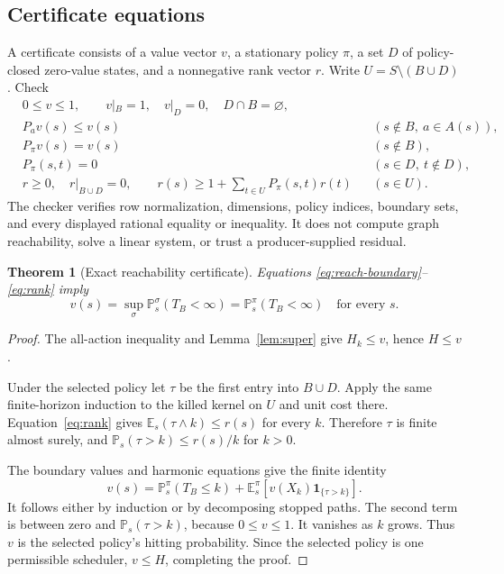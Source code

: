 \documentclass[11pt,letterpaper]{article}
\newtheorem{theorem}{Theorem}[section]
\theoremstyle{definition}\newtheorem{definition}[theorem]{Definition}
\theoremstyle{remark}\newtheorem{remark}[theorem]{Remark}
\newcommand{\E}{\mathbb E}\newcommand{\Prob}{\mathbb P}
\newcommand{\ind}{\mathbf 1}\newcommand{\forge}{\texttt{forge}}
\begin{document}
\subsection{Certificate equations}
A certificate consists of a value vector $v$, a stationary policy $\pi$, a set $D$ of policy-closed zero-value states, and a nonnegative rank vector $r$. Write $U=S\setminus(B\cup D)$. Check
\begin{align}
 &0\le v\le1,\qquad v|_B=1,\quad v|_D=0,\quad D\cap B=\varnothing,\label{eq:reach-boundary}\\
 &P_av(s)\le v(s) &&(s\notin B,\ a\in A(s)),\label{eq:reach-upper}\\
 &P_\pi v(s)=v(s) &&(s\notin B),\label{eq:reach-harmonic}\\
 &P_\pi(s,t)=0 &&(s\in D,\ t\notin D),\label{eq:dead-closed}\\
 &r\ge0,\quad r|_{B\cup D}=0,\qquad
 r(s)\ge1+\sum_{t\in U}P_\pi(s,t)r(t) &&(s\in U).\label{eq:rank}
\end{align}
The checker verifies row normalization, dimensions, policy indices, boundary sets, and every displayed rational equality or inequality. It does not compute graph reachability, solve a linear system, or trust a producer-supplied residual.

\begin{theorem}[Exact reachability certificate]\label{thm:reach}
Equations \eqref{eq:reach-boundary}--\eqref{eq:rank} imply
\[
 v(s)=\sup_\sigma\Prob_s^\sigma(T_B<\infty)
     =\Prob_s^\pi(T_B<\infty)
 \quad\text{for every }s.
\]
\end{theorem}
\begin{proof}
The all-action inequality and Lemma~\ref{lem:super} give $H_k\le v$, hence $H\le v$.

Under the selected policy let $\tau$ be the first entry into $B\cup D$. Apply the same finite-horizon induction to the killed kernel on $U$ and unit cost there. Equation~\eqref{eq:rank} gives $\E_s(\tau\wedge k)\le r(s)$ for every $k$. Therefore $\tau$ is finite almost surely, and $\Prob_s(\tau>k)\le r(s)/k$ for $k>0$.

The boundary values and harmonic equations give the finite identity
\[
 v(s)=\Prob_s^\pi(T_B\le k)
       +\E_s^\pi\!\left[v(X_k)\ind_{\{\tau>k\}}\right].
\]
It follows either by induction or by decomposing stopped paths. The second term is between zero and $\Prob_s(\tau>k)$, because $0\le v\le1$. It vanishes as $k$ grows. Thus $v$ is the selected policy's hitting probability. Since the selected policy is one permissible scheduler, $v\le H$, completing the proof.
\end{proof}
\end{document}
